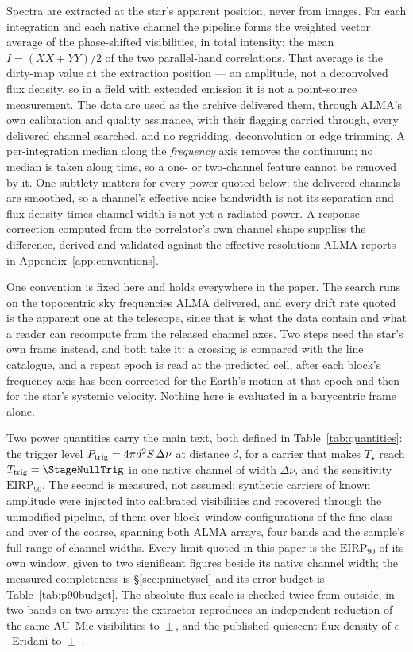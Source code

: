 Spectra are extracted at the star's apparent position, never from images.
For each integration and each native channel the pipeline forms the weighted
vector average of the phase-shifted visibilities, in total intensity: the
mean $I=(XX+YY)/2$ of the two parallel-hand correlations. That average is the
dirty-map value at the extraction position --- an amplitude, not a
deconvolved flux density, so in a field with extended emission it is not a
point-source measurement. The data are used as the archive delivered them,
through ALMA's own calibration and quality assurance, with their flagging
carried through, every delivered channel searched, and no regridding,
deconvolution or edge trimming. A per-integration median along the
\emph{frequency} axis removes the continuum; no median is taken along
time, so a one- or two-channel feature cannot be removed by it. One
subtlety matters for every power quoted below: the delivered channels are
smoothed, so a channel's effective noise bandwidth is not its separation and
flux density times channel width is not yet a radiated power. A response
correction computed from the correlator's own channel shape supplies the
difference, derived and validated against the effective resolutions ALMA
reports in Appendix~\ref{app:conventions}.

One convention is fixed here and holds everywhere in the paper. The search
runs on the topocentric sky frequencies ALMA delivered, and every drift rate
quoted is the apparent one at the telescope, since that is what the data
contain and what a reader can recompute from the released channel axes. Two
steps need the star's own frame instead, and both take it: a crossing is
compared with the line catalogue, and a repeat epoch is read at the predicted
cell, after each block's frequency axis has been corrected for the Earth's
motion at that epoch and then for the star's systemic velocity. Nothing here
is evaluated in a barycentric frame alone.

Two power quantities carry the main text, both defined in
Table~\ref{tab:quantities}: the trigger level $P_{\rm trig} = 4\pi
d^{2}S\,\Delta\nu$ at distance $d$, for a carrier that makes $T_\star$ reach
$T_{\rm trig}=\StageNullTrig$ in one native channel of width $\Delta\nu$,
and the sensitivity $\mathrm{EIRP}_{90}$. The second is measured, not
assumed: synthetic carriers of known amplitude were injected into
calibrated visibilities and recovered through the unmodified pipeline,
\SelNTone{} of them over \SelNUnit{} block--window configurations of the
fine class and \SensNToneCoarse{} over \SensNInjCoarse{} of the coarse,
spanning both ALMA arrays, four bands and the sample's full range of
channel widths. Every limit quoted in
this paper is the $\mathrm{EIRP}_{90}$ of its own window, given to two
significant figures beside its native channel width; the measured
completeness is \S\ref{sec:pninetysel} and its error
budget is Table~\ref{tab:p90budget}. The absolute flux scale is checked twice from
outside, in two bands on two arrays: the extractor reproduces an
independent reduction of the same AU~Mic visibilities to
\PxJanRatio\,$\pm$\,\PxJanRatioErr, and the published quiescent flux
density of $\epsilon$~Eridani to \PxEpsRatio\,$\pm$\,\PxEpsRatioErr{}
\citep{Burton2022}.

